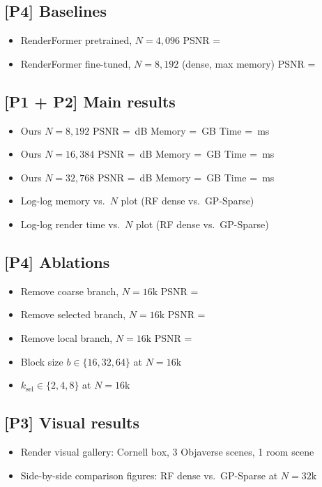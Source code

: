 \documentclass[11pt,a4paper]{article}
\newcommand{\role}[1]{\textbf{[#1]}}
\newcommand{\sq}{\item[$\square$]}
\begin{document}
\subsection{\role{P4} Baselines}
\begin{itemize}[leftmargin=1.8em, itemsep=2pt]
  \sq RenderFormer pretrained, $N = 4{,}096$ \quad PSNR = \underline{\hspace{2.5cm}}
  \sq RenderFormer fine-tuned, $N = 8{,}192$ (dense, max memory)
      \quad PSNR = \underline{\hspace{2.5cm}}
\end{itemize}

\subsection{\role{P1 + P2} Main results}
\begin{itemize}[leftmargin=1.8em, itemsep=2pt]
  \sq Ours $N = 8{,}192$ \quad
      PSNR = \underline{\phantom{XX}}\,dB \quad
      Memory = \underline{\phantom{XX}}\,GB \quad
      Time = \underline{\phantom{XX}}\,ms
  \sq Ours $N = 16{,}384$ \quad
      PSNR = \underline{\phantom{XX}}\,dB \quad
      Memory = \underline{\phantom{XX}}\,GB \quad
      Time = \underline{\phantom{XX}}\,ms
  \sq Ours $N = 32{,}768$ \quad
      PSNR = \underline{\phantom{XX}}\,dB \quad
      Memory = \underline{\phantom{XX}}\,GB \quad
      Time = \underline{\phantom{XX}}\,ms
  \sq Log-log memory vs.\ $N$ plot (RF dense vs.\ GP-Sparse)
  \sq Log-log render time vs.\ $N$ plot (RF dense vs.\ GP-Sparse)
\end{itemize}

\subsection{\role{P4} Ablations}
\begin{itemize}[leftmargin=1.8em, itemsep=2pt]
  \sq Remove coarse branch, $N = 16\text{k}$ \quad PSNR = \underline{\hspace{2.5cm}}
  \sq Remove selected branch, $N = 16\text{k}$ \quad PSNR = \underline{\hspace{2.5cm}}
  \sq Remove local branch, $N = 16\text{k}$ \quad PSNR = \underline{\hspace{2.5cm}}
  \sq Block size $b \in \{16, 32, 64\}$ at $N = 16\text{k}$
  \sq $k_\text{sel} \in \{2, 4, 8\}$ at $N = 16\text{k}$
\end{itemize}

\subsection{\role{P3} Visual results}
\begin{itemize}[leftmargin=1.8em, itemsep=2pt]
  \sq Render visual gallery: Cornell box, 3 Objaverse scenes, 1 room scene
  \sq Side-by-side comparison figures: RF dense vs.\ GP-Sparse at $N = 32\text{k}$
\end{itemize}
\end{document}
